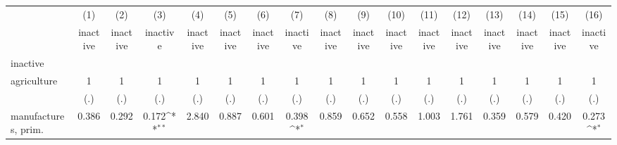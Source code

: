 {
\def\sym#1{\ifmmode^{#1}\else\(^{#1}\)\fi}
\begin{tabular}{l*{16}{c}}
\hline\hline
                    &\multicolumn{1}{c}{(1)}&\multicolumn{1}{c}{(2)}&\multicolumn{1}{c}{(3)}&\multicolumn{1}{c}{(4)}&\multicolumn{1}{c}{(5)}&\multicolumn{1}{c}{(6)}&\multicolumn{1}{c}{(7)}&\multicolumn{1}{c}{(8)}&\multicolumn{1}{c}{(9)}&\multicolumn{1}{c}{(10)}&\multicolumn{1}{c}{(11)}&\multicolumn{1}{c}{(12)}&\multicolumn{1}{c}{(13)}&\multicolumn{1}{c}{(14)}&\multicolumn{1}{c}{(15)}&\multicolumn{1}{c}{(16)}\\
                    &\multicolumn{1}{c}{inactive}&\multicolumn{1}{c}{inactive}&\multicolumn{1}{c}{inactive}&\multicolumn{1}{c}{inactive}&\multicolumn{1}{c}{inactive}&\multicolumn{1}{c}{inactive}&\multicolumn{1}{c}{inactive}&\multicolumn{1}{c}{inactive}&\multicolumn{1}{c}{inactive}&\multicolumn{1}{c}{inactive}&\multicolumn{1}{c}{inactive}&\multicolumn{1}{c}{inactive}&\multicolumn{1}{c}{inactive}&\multicolumn{1}{c}{inactive}&\multicolumn{1}{c}{inactive}&\multicolumn{1}{c}{inactive}\\
\hline
inactive            &                     &                     &                     &                     &                     &                     &                     &                     &                     &                     &                     &                     &                     &                     &                     &                     \\
agriculture         &           1         &           1         &           1         &           1         &           1         &           1         &           1         &           1         &           1         &           1         &           1         &           1         &           1         &           1         &           1         &           1         \\
                    &         (.)         &         (.)         &         (.)         &         (.)         &         (.)         &         (.)         &         (.)         &         (.)         &         (.)         &         (.)         &         (.)         &         (.)         &         (.)         &         (.)         &         (.)         &         (.)         \\
[1em]
manufactures, prim. &       0.386         &       0.292         &       0.172\sym{**} &       2.840         &       0.887         &       0.601         &       0.398\sym{*}  &       0.859         &       0.652         &       0.558         &       1.003         &       1.761         &       0.359         &       0.579         &       0.420         &       0.273\sym{*}  \\

\end{tabular}}
